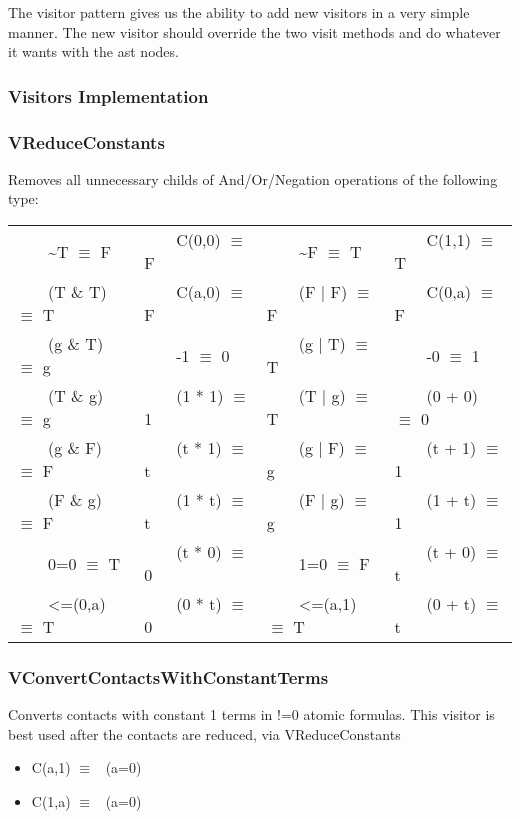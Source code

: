 \documentclass{article}
\newcommand{\tabitem}{~~\llap{\textbullet}~~}
\begin{document}
				The visitor pattern gives us the ability to add new visitors in a very simple manner.
				The new visitor should override the two visit methods and do whatever it wants with the ast nodes.
				\newline

			\subsubsection*{Visitors Implementation}
				\subsubsection*{VReduceConstants}
					Removes all unnecessary childs of And/Or/Negation operations of the following type:

					\begin{table}[H]
					  \centering
					  \begin{tabular}{llll}
					    \toprule
					    \midrule
					\tabitem \textasciitilde T $\equiv$ F & \tabitem C(0,0)  $\equiv$ F & \tabitem \textasciitilde F $\equiv$ T & \tabitem C(1,1) $\equiv$ T \\
					\tabitem (T \& T) $\equiv$ T & \tabitem C(a,0)  $\equiv$ F & \tabitem (F | F) $\equiv$ F & \tabitem C(0,a) $\equiv$ F \\
					\tabitem (g \& T) $\equiv$ g & \tabitem -1 $\equiv$ 0 & \tabitem (g | T) $\equiv$ T & \tabitem -0 $\equiv$ 1 \\
					\tabitem (T \& g) $\equiv$ g & \tabitem (1 * 1) $\equiv$ 1 & \tabitem (T | g) $\equiv$ T & \tabitem (0 + 0) $\equiv$ 0 \\
					\tabitem (g \& F) $\equiv$ F & \tabitem (t * 1) $\equiv$ t & \tabitem (g | F) $\equiv$ g & \tabitem (t + 1) $\equiv$ 1 \\
					\tabitem (F \& g) $\equiv$ F & \tabitem (1 * t) $\equiv$ t & \tabitem (F | g) $\equiv$ g & \tabitem (1 + t) $\equiv$ 1 \\
					\tabitem 0=0 $\equiv$ T & \tabitem (t * 0) $\equiv$ 0 & \tabitem 1=0 $\equiv$ F & \tabitem (t + 0) $\equiv$ t \\
					\tabitem <=(0,a) $\equiv$ T & \tabitem (0 * t) $\equiv$ 0 & \tabitem <=(a,1) $\equiv$ T & \tabitem (0 + t) $\equiv$ t \\

					    \bottomrule
					  \end{tabular}
					\end{table}
				\subsubsection*{VConvertContactsWithConstantTerms}
					Converts contacts with constant 1 terms in !=0 atomic formulas. 
					This visitor is best used after the contacts are reduced, via VReduceConstants
					\begin{itemize}
						\item C(a,1) $\equiv$ ~(a=0)  
						\item C(1,a) $\equiv$ ~(a=0)
					\end{itemize}
\end{document}
